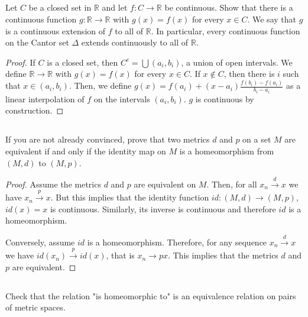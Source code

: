 
\subsection{} Let $C$ be a closed set in $\mathbb{R}$ and let $f: C \rightarrow \mathbb{R}$ be continuous. Show that there is a continuous function $g : \mathbb{R} \rightarrow \mathbb{R}$ with $g(x) = f(x)$ for every $x \in C$. We say that $g$ is a continuous extension of $f$ to all of $\mathbb{R}$. In particular, every continuous function on the Cantor set $\Delta$ extends continuously to all of $\mathbb{R}$.

\begin{proof}
If $C$ is a closed set, then $C^c = \bigcup (a_i, b_i)$, a union of open intervals. We define $\mathbb{R} \rightarrow \mathbb{R}$ with $g(x) = f(x)$ for every $x \in C$. If $x \notin C$, then there is $i$ such that $x \in (a_i, b_i)$. Then, we define $g(x) = f(a_i) + (x - a_i)\frac{f(b_i) - f(a_i)}{b_i - a_i}$ as a linear interpolation of $f$ on the intervals $(a_i, b_i)$.
$g$ is continuous by construction.

\end{proof}



\subsection{} If you are not already convinced, prove that two metrics $d$ and $p$ on a set $M$ are equivalent if and only if the identity map on $M$ is a homeomorphism from $(M, d)$ to $(M, p)$.

\begin{proof}
Assume the metrics $d$ and $p$ are equivalent on $M$.
Then, for all $x_n \xrightarrow{d} x$ we have $x_n \xrightarrow{p} x$. But this implies that the identity function $id: (M,d) \rightarrow (M,p)$, $id(x)=x$ is continuous. Similarly, its inverse is continuous and therefore $id$ is a homeomorphism.

Conversely, assume $id$ is a homeomorphism. Therefore, for any sequence $x_n \xrightarrow{d} x$ we have $id(x_n) \xrightarrow{p} id(x)$, that is $x_n \rightarrow{p} x$. This implies that the metrics $d$ and $p$ are equivalent.


\end{proof}

\subsection{} Check that the relation "is homeomorphic to" is an equivalence relation on pairs of metric spaces.


